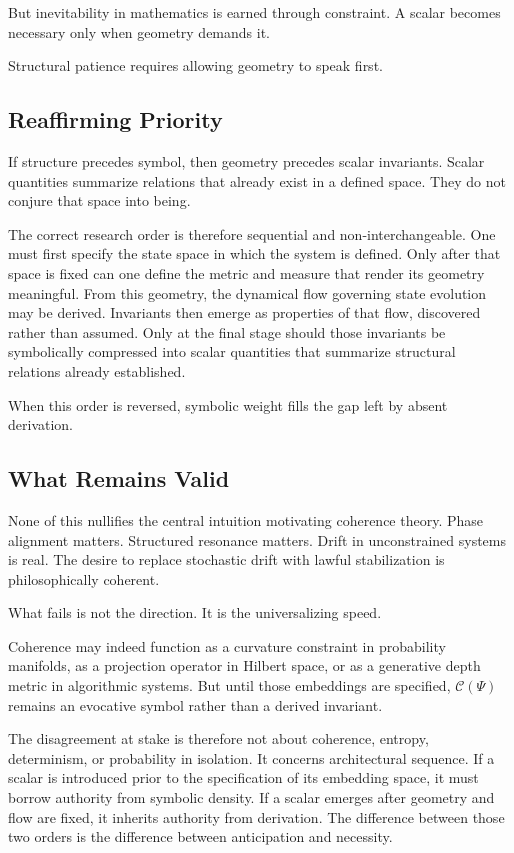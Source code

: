 \documentclass[12pt]{article}
\begin{document}
But inevitability in mathematics is earned through constraint. A scalar becomes necessary only when geometry demands it.

Structural patience requires allowing geometry to speak first.

\subsection{Reaffirming Priority}

If structure precedes symbol, then geometry precedes scalar invariants. Scalar quantities summarize relations that already exist in a defined space. They do not conjure that space into being.


The correct research order is therefore sequential and non-interchangeable. One must first specify the state space in which the system is defined. Only after that space is fixed can one define the metric and measure that render its geometry meaningful. From this geometry, the dynamical flow governing state evolution may be derived. Invariants then emerge as properties of that flow, discovered rather than assumed. Only at the final stage should those invariants be symbolically compressed into scalar quantities that summarize structural relations already established.

When this order is reversed, symbolic weight fills the gap left by absent derivation.

\subsection{What Remains Valid}

None of this nullifies the central intuition motivating coherence theory. Phase alignment matters. Structured resonance matters. Drift in unconstrained systems is real. The desire to replace stochastic drift with lawful stabilization is philosophically coherent.

What fails is not the direction. It is the universalizing speed.

Coherence may indeed function as a curvature constraint in probability manifolds, as a projection operator in Hilbert space, or as a generative depth metric in algorithmic systems. But until those embeddings are specified, $\mathcal{C}(\Psi)$ remains an evocative symbol rather than a derived invariant.

The disagreement at stake is therefore not about coherence, entropy, determinism, or probability in isolation. It concerns architectural sequence. If a scalar is introduced prior to the specification of its embedding space, it must borrow authority from symbolic density. If a scalar emerges after geometry and flow are fixed, it inherits authority from derivation. The difference between those two orders is the difference between anticipation and necessity. 
\end{document}
